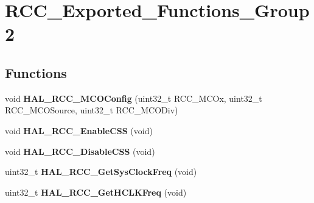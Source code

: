 \hypertarget{group___r_c_c___exported___functions___group2}{}\section{R\+C\+C\+\_\+\+Exported\+\_\+\+Functions\+\_\+\+Group2}
\label{group___r_c_c___exported___functions___group2}
\subsection*{Functions}
\begin{DoxyCompactItemize}
\item 
\mbox{\label{group___r_c_c___exported___functions___group2_ga9de46b9c4ecdb1a5e34136b051a6132c}} 
void {\bfseries H\+A\+L\+\_\+\+R\+C\+C\+\_\+\+M\+C\+O\+Config} (uint32\+\_\+t R\+C\+C\+\_\+\+M\+C\+Ox, uint32\+\_\+t R\+C\+C\+\_\+\+M\+C\+O\+Source, uint32\+\_\+t R\+C\+C\+\_\+\+M\+C\+O\+Div)
\item 
\mbox{\label{group___r_c_c___exported___functions___group2_gaa0f440ce71c18e95b12b2044cc044bea}} 
void {\bfseries H\+A\+L\+\_\+\+R\+C\+C\+\_\+\+Enable\+C\+SS} (void)
\item 
\mbox{\label{group___r_c_c___exported___functions___group2_gac2f9cf8f56fd7b22c62ddf32aa5ee3fb}} 
void {\bfseries H\+A\+L\+\_\+\+R\+C\+C\+\_\+\+Disable\+C\+SS} (void)
\item 
\mbox{\label{group___r_c_c___exported___functions___group2_ga887cafe88b21a059061b077a1e3fa7d8}} 
uint32\+\_\+t {\bfseries H\+A\+L\+\_\+\+R\+C\+C\+\_\+\+Get\+Sys\+Clock\+Freq} (void)
\item 
\mbox{\label{group___r_c_c___exported___functions___group2_ga38d6c5c7a5d8758849912c9aa0a2156d}} 
uint32\+\_\+t {\bfseries H\+A\+L\+\_\+\+R\+C\+C\+\_\+\+Get\+H\+C\+L\+K\+Freq} (void)
\item 
\mbox{\label{group___r_c_c___exported___functions___group2_gab3042d8ac5703ac696cabf0ee461c599}} 

\end{DoxyCompactItemize}
